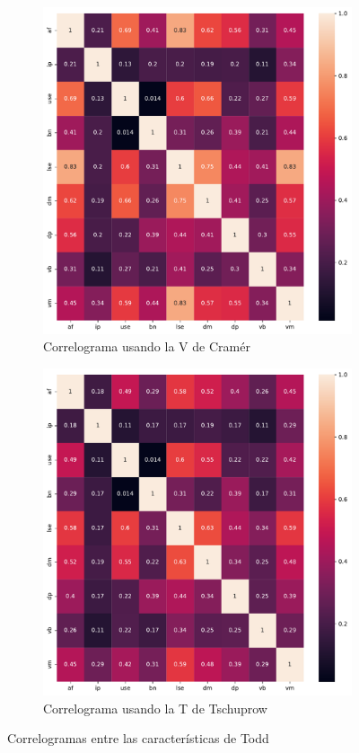 \begin{figure}
    \centering
    \begin{subfigure}{\textwidth}
        \centering
        \includegraphics[width=0.7\linewidth]{../../scripts/eda/assoc_plot_cramersv.pdf}
        \caption{Correlograma usando la V de Cramér}
        \label{fig4:todd_chars__cramersv}
    \end{subfigure}
    \begin{subfigure}{\textwidth}
        \centering
        \includegraphics[width=0.7\linewidth]{../../scripts/eda/assoc_plot_tschuprow.pdf}
        \caption{Correlograma usando la T de Tschuprow}
        \label{fig4:todd_chars__tschuprow}
    \end{subfigure}
    \caption[Correlogramas entre características de Todd]{Correlogramas entre las características de Todd}
    \label{fig4:todd_chars_correlogram}
\end{figure}

